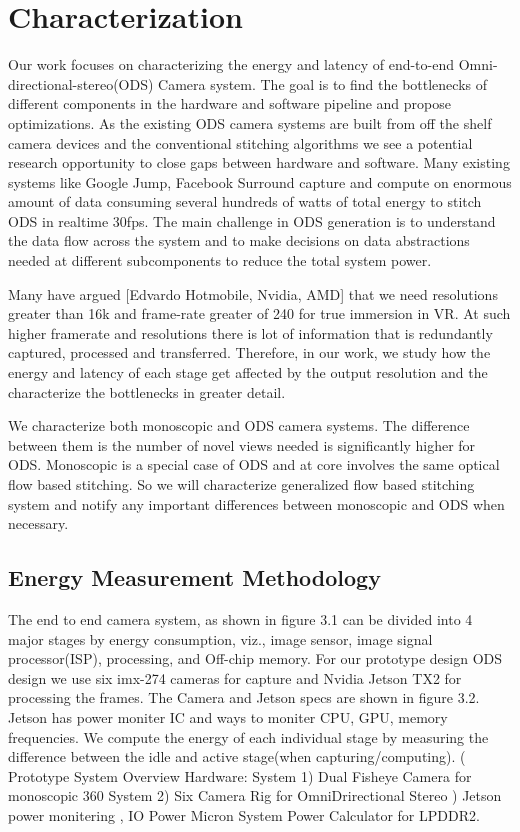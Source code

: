 \chapter{Characterization}

Our work focuses on characterizing the energy and latency of end-to-end Omni-directional-stereo(ODS) Camera  system. The goal is to find the bottlenecks of different components in the hardware and software pipeline and propose optimizations. As the existing ODS camera systems are built from off the shelf camera devices and the conventional stitching algorithms we see a potential research opportunity to close gaps between hardware and software. Many existing systems like Google Jump, Facebook Surround capture and compute on enormous amount of data consuming several hundreds of watts of total energy to stitch ODS in realtime 30fps. The main challenge in ODS generation is to understand the data flow across the system and to make decisions on data abstractions needed at different subcomponents to reduce the total system power.

Many have argued [Edvardo Hotmobile, Nvidia, AMD] that we need resolutions greater than 16k and frame-rate greater of 240 for true immersion in VR. At such higher framerate and resolutions there is lot of information that is redundantly captured, processed and transferred. Therefore, in our work, we study how the energy and latency of each stage get affected by the output resolution and the characterize the bottlenecks in greater detail. 

We characterize both monoscopic and ODS camera systems. The difference between them is the number of novel views needed is significantly higher for ODS. Monoscopic is a special case of ODS and at core involves the same optical flow based stitching. So we will characterize generalized flow based stitching system and notify any important differences between monoscopic and ODS when necessary.\newline

\section{Energy Measurement Methodology}

The end to end camera system, as shown in figure 3.1 can be divided into 4 major stages by energy consumption, viz., image sensor, image signal processor(ISP), processing, and Off-chip memory. For our prototype design ODS design we use six imx-274 cameras for capture and Nvidia Jetson TX2 for processing the frames. The Camera and Jetson specs are shown in figure 3.2. Jetson has power moniter IC and ways to moniter CPU, GPU, memory frequencies. We compute the energy of each individual stage by measuring the difference between the idle and active stage(when capturing/computing).
(
Prototype System Overview \newline
Hardware:
System 1) Dual Fisheye Camera for monoscopic 360
System 2) Six Camera Rig for OmniDrirectional Stereo
)
Jetson power monitering , IO Power
Micron System Power Calculator for LPDDR2. \newline

